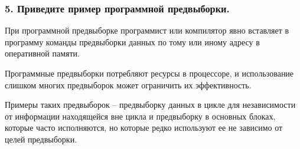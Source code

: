 \subsubsection{5. Приведите пример программной предвыборки.}

При программной предвыборке программист или компилятор явно вставляет в программу команды предвыборки данных по тому или иному адресу в оперативной памяти. 

Программные предвыборки потребляют ресурсы в процессоре, и использование слишком многих предвыборок может ограничить их эффективность. 

Примеры таких предвыборок -- предвыборку данных в цикле для независимости от информации находящейся вне цикла и предвыборку в основных блоках, которые часто исполняются, но которые редко используют ее не зависимо от целей предвыборки.